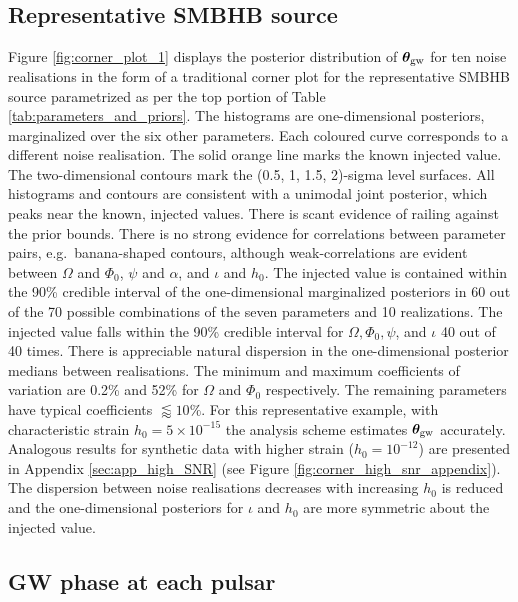 \documentclass[fleqn,usenatbib,useAMS]{mnras}
\begin{document}
\subsection{Representative SMBHB source}\label{sec:rep_smbh_source}

Figure \ref{fig:corner_plot_1} displays the posterior distribution of $\boldsymbol{\theta}_{\rm gw}$ for ten noise realisations in the form of a traditional corner plot for the representative SMBHB source parametrized as per the top portion of Table \ref{tab:parameters_and_priors}. The histograms are one-dimensional posteriors, marginalized over the six other parameters. Each coloured curve corresponds to a different noise realisation. The solid orange line marks the known injected value. The two-dimensional contours mark the (0.5, 1, 1.5, 2)-sigma level surfaces. All histograms and contours are consistent with a unimodal joint posterior, which peaks near the known, injected values. There is scant evidence of railing against the prior bounds. There is no strong evidence for correlations between parameter pairs, e.g.\ banana-shaped contours, although weak-correlations are evident between $\Omega$ and $\Phi_0$, $\psi$ and $\alpha$, and $\iota$ and $h_0$. The injected value is contained within the 90\% credible interval of the one-dimensional marginalized posteriors in 60 out of the 70 possible combinations of the seven parameters and 10 realizations. The injected value falls within the 90\% credible interval for $\Omega, \Phi_0, \psi$, and  $\iota$ 40 out of 40 times. There is appreciable natural dispersion in the one-dimensional posterior medians between realisations. The minimum and maximum coefficients of variation are 0.2\% and 52\% for $\Omega$ and $\Phi_0$ respectively. The remaining parameters have typical coefficients $\lessapprox 10 \%$. For this representative example, with characteristic strain $h_0 = 5 \times 10^{-15}$ the analysis scheme estimates $\boldsymbol{\theta}_{\rm gw}$ accurately. Analogous results for synthetic data with higher strain ($h_0 = 10^{-12}$) are presented in Appendix \ref{sec:app_high_SNR} (see Figure \ref{fig:corner_high_snr_appendix}). The dispersion between noise realisations decreases with increasing $h_0$ is reduced and the one-dimensional posteriors for $\iota$ and $h_0$ are more symmetric about the injected value. \newline 

\subsection{GW phase at each pulsar} \label{sec:chi_estim}
\end{document}
